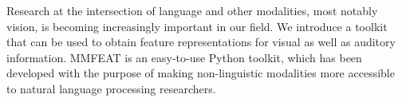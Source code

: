 Research at the intersection of language and other modalities, most notably vision, is becoming increasingly important in our field. We introduce a toolkit that can be used to obtain feature representations for visual as well as auditory information. MMFEAT is an easy-to-use Python toolkit, which has been developed with the purpose of making non-linguistic modalities more accessible to natural language processing researchers.
